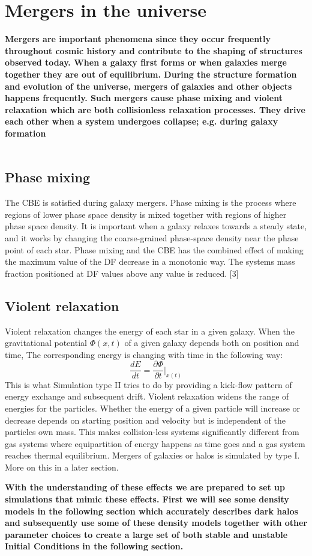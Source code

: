 \section{Mergers in the universe}
\textbf{Mergers are important phenomena since they occur frequently throughout cosmic history and contribute to the shaping of structures observed today. When a galaxy first forms or when galaxies merge together they are out of equilibrium. During the structure formation and evolution of the universe, mergers of galaxies and other objects happens frequently. Such mergers cause phase mixing and violent relaxation which are both collisionless relaxation processes. They drive each other when a system undergoes collapse; e.g. during galaxy formation} \\ \\

\subsection{Phase mixing}
The CBE is satisfied during galaxy mergers. Phase mixing is the process where regions of lower phase space density is mixed together with regions of higher phase space density. It is important when a galaxy relaxes towards a steady state, and it works by changing the coarse-grained phase-space density near the phase point of each star. Phase mixing and the CBE has the combined effect of making the maximum value of the DF decrease in a monotonic way. The systems mass fraction positioned at DF values above any value is reduced. [3]

\subsection{Violent relaxation}
Violent relaxation changes the energy of each star in a given galaxy. 
When the gravitational potential $\Phi (x,t)$ of a given galaxy depends both on position and time, The corresponding energy is changing with time in the following way: \\
\begin{equation}
\frac{d E}{d t} = \frac{\partial \Phi}{\partial t} \bigg|_{x(t)}
\end{equation}
This is what Simulation type II tries to do by providing a kick-flow pattern of energy exchange and subsequent drift.
Violent relaxation widens the range of energies for the particles. Whether the energy of a given particle will increase or decrease depends on starting position and velocity but is independent of the particles own mass. This makes collision-less systems significantly different from gas systems where equipartition of energy happens as time goes and a gas system reaches thermal equilibrium. Mergers of galaxies or halos is simulated by type I. More on this in a later section.

\textbf{With the understanding of these effects we are prepared to set up simulations that mimic these effects. First we will see some density models in the following section which accurately describes dark halos and subsequently use some of these density models together with other parameter choices to create a large set of both stable and unstable Initial Conditions in the following section.}